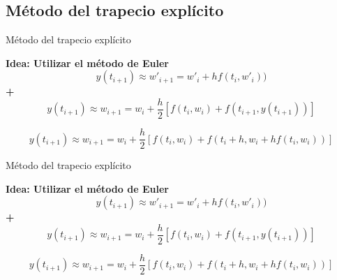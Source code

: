 	\subsection{Método del trapecio explícito}


		\begin{frame}{Método del trapecio explícito}
			\fontsize{10}{10}\selectfont		
			\centering
			\begin{tcolorbox}[colback=ChetwodeBlue!10,colframe=ChetwodeBlue!60]
				\centering
				\textbf{Idea: Utilizar el método de Euler}
				\begin{equation*}
					y(t_{i+1}) \approx w'_{i+1} = w'_i + h f(t_i,w'_i))
				\end{equation*}
				{\large\textbf{+}}
				\begin{equation*}
					y(t_{i+1}) \approx w_{i+1} = w_i + \frac{h}{2} \left[f(t_i,w_i) + f(t_{i+1}, y(t_{i+1}))\right]
				\end{equation*}			
			\end{tcolorbox}			

			 \begin{definition}
				\begin{equation} \label{eq:app-exp}
					y(t_{i+1}) \approx w_{i+1} = w_i + \frac{h}{2} \left[f(t_i,w_i) + f(t_{i}+h, w_i + h f(t_i,w_i))\right]
				\end{equation}
			 \end{definition}
			
		\end{frame}

		\begin{frame}{Método del trapecio explícito}
			\fontsize{10}{10}\selectfont		
			\centering
			\begin{tcolorbox}[colback=ChetwodeBlue!10,colframe=ChetwodeBlue!60]
				\centering
				\textbf{Idea: Utilizar el método de Euler}
				\begin{equation*}
				y(t_{i+1}) \approx w'_{i+1} = w'_i + h f(t_i,w'_i))
				\end{equation*}
				{\large\textbf{+}}
				\begin{equation*}
				y(t_{i+1}) \approx w_{i+1} = w_i + \frac{h}{2} \left[f(t_i,w_i) + f(t_{i+1}, y(t_{i+1}))\right]
				\end{equation*}			
			\end{tcolorbox}			
			
			\begin{definition}
				\begin{equation} \label{eq:app-exp}
				y(t_{i+1}) \approx w_{i+1} = w_i + \frac{h}{2} \left[f(t_i,w_i) + f(t_{i}+h, w_i + h f(t_i,w_i))\right]
				\end{equation}
			\end{definition}
			
		\end{frame}